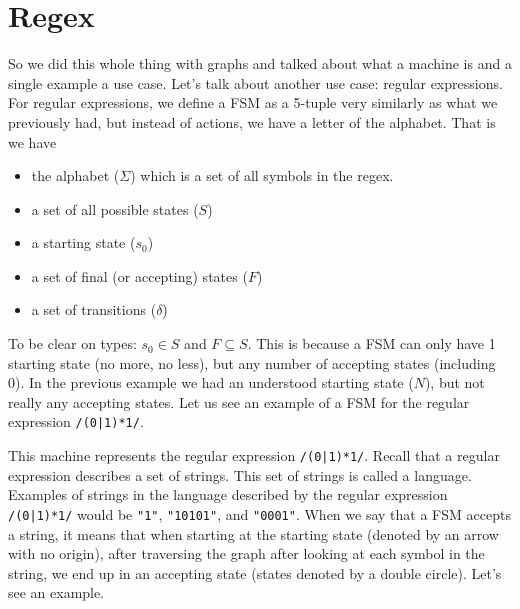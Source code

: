 \documentclass[main.tex]{subfiles}
\begin{document}
\section{Regex}

So we did this whole thing with graphs and talked about what a machine is and a single example a use case. 
Let's talk about another use case: regular expressions. For regular expressions, we define a FSM as a 5-tuple very similarly as what we previously had, but instead of actions, we have a letter of the alphabet. That is we have
\begin{itemize}
    \item the alphabet ($\Sigma$) which is a set of all symbols in the regex. 
    \item a set of all possible states ($S$)
    \item a starting state ($s_0$)
    \item a set of final (or accepting) states ($F$)
    \item a set of transitions ($\delta$)
\end{itemize}
To be clear on types: $s_0 \in S$ and $F \subseteq S$. This is because a FSM can only have 1 starting state (no more, no less), but any number of accepting states (including 0). In the previous example we had an understood starting state ($N$), but not really any accepting states. Let us see an example of a FSM for the regular expression \texttt{/(0|1)*1/}. 

\begin{center}
\end{center}

This machine represents the regular expression \texttt{/(0|1)*1/}. Recall that a regular expression describes a set of strings. This set of strings is called a language. Examples of strings in the language described by the regular expression \texttt{/(0|1)*1/} would be \texttt{"1"}, \texttt{"10101"}, and \texttt{"0001"}. When we say that a FSM accepts a string, it means that when starting at the starting state (denoted by an arrow with no origin), after traversing the graph after looking at each symbol in the string, we end up in an accepting state (states denoted by a double circle). Let's see an example.
\end{document}
